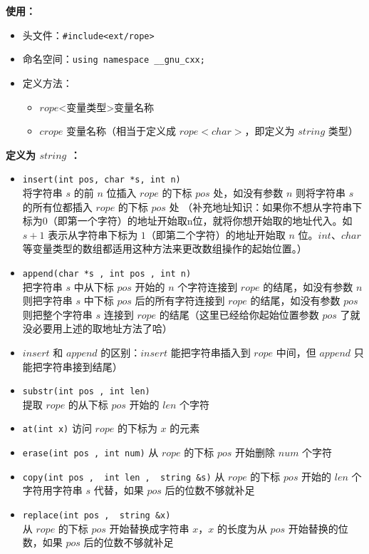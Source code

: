 \documentclass[C:/Users/12748/Desktop/latex模板/main/main.tex]{subfiles}
\begin{document}
\textbf{使用：}

\begin{itemize}
\item
  头文件：\texttt{\#include\textless{}ext/rope\textgreater{}}
\item
  命名空间：\texttt{using\ namespace\ \_\_gnu\_cxx;}
\item
  定义方法：

  \begin{itemize}
  \item
    \(rope\)\textless 变量类型\textgreater 变量名称
  \item
    \(crope\) 变量名称（相当于定义成 \(rope<char>\)，即定义为 \(string\)
    类型）
  \end{itemize}
\end{itemize}

\textbf{定义为 \(string\) ：}

\begin{itemize}
\item
  \texttt{insert(int\ pos,\ char\ *s,\ int\ n)} ~\\
  将字符串 \(s\) 的前 \(n\) 位插入 \(rope\) 的下标 \(pos\)
  处，如没有参数 \(n\) 则将字符串 \(s\) 的所有位都插入 \(rope\) 的下标
  \(pos\) 处
  （补充地址知识：如果你不想从字符串下标为0（即第一个字符）的地址开始取n位，就将你想开始取的地址代入。如
  \(s+1\) 表示从字符串下标为 \(1\)（即第二个字符）的地址开始取 \(n\)
  位。\(int、char\)等变量类型的数组都适用这种方法来更改数组操作的起始位置。）
\item
  \texttt{append(char\ *s\ ,\ int\ pos\ ,\ int\ n)}~\\
  把字符串 \(s\) 中从下标 \(pos\) 开始的 \(n\) 个字符连接到 \(rope\)
  的结尾，如没有参数 \(n\) 则把字符串 \(s\) 中下标 \(pos\)
  后的所有字符连接到 \(rope\) 的结尾，如没有参数 \(pos\) 则把整个字符串
  \(s\) 连接到 \(rope\) 的结尾（这里已经给你起始位置参数 \(pos\)
  了就没必要用上述的取地址方法了哈）
\item
  \(insert\) 和 \(append\) 的区别：\(insert\) 能把字符串插入到 \(rope\)
  中间，但 \(append\) 只能把字符串接到结尾）
\item
  \texttt{substr(int\ pos\ ,\ int\ len)} ~\\
  提取 \(rope\) 的从下标 \(pos\) 开始的 \(len\) 个字符
\item
  \texttt{at(int\ x)} 访问 \(rope\) 的下标为 \(x\) 的元素
\item
  \texttt{erase(int\ pos\ ,\ int\ num)} 从 \(rope\) 的下标 \(pos\)
  开始删除 \(num\) 个字符
\item
  \texttt{copy(int\ pos\ ,\ \ int\ len\ ,\ \ string\ \&s)} 从 \(rope\)
  的下标 \(pos\) 开始的 \(len\) 个字符用字符串 \(s\) 代替，如果 \(pos\)
  后的位数不够就补足
\item
  \texttt{replace(int\ pos\ ,\ \ string\ \&x)} ~\\
  从 \(rope\) 的下标 \(pos\) 开始替换成字符串 \(x\)，\(x\) 的长度为从
  \(pos\) 开始替换的位数，如果 \(pos\) 后的位数不够就补足
\end{itemize}
\end{document}
